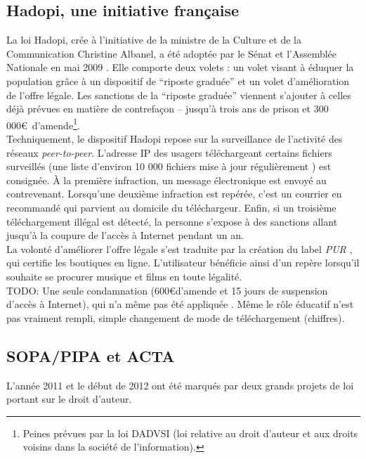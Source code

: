\documentclass[a4paper]{report}
\begin{document}
		\subsection{Hadopi, une initiative française}
		La loi Hadopi, crée à l'initiative de la ministre de la Culture et de la Communication Christine Albanel, a été adoptée par le Sénat et l'Assemblée Nationale en mai 2009 \cite{hadopi-adoption}. Elle comporte deux volets : un volet visant à éduquer la population grâce à un dispositif de ``riposte graduée'' et un volet d'amélioration de l'offre légale. Les sanctions de la ``riposte graduée'' viennent s'ajouter à celles déjà prévues en matière de contrefaçon – jusqu'à trois ans de prison et 300 000\euro\ d'amende\footnote{Peines prévues par la loi DADVSI (loi relative au droit d’auteur et aux droits voisins dans la société de l’information).}.\\

		Techniquement, le dispositif Hadopi repose sur la surveillance de l'activité des réseaux \emph{peer-to-peer}. L'adresse IP des usagers téléchargeant certains fichiers surveillés (une liste d'environ 10 000 fichiers mise à jour régulièrement \cite{hadopi-fichiers-surveilles}) est consignée. À la première infraction, un message électronique est envoyé au contrevenant. Lorsqu'une deuxième infraction est repérée, c'est un courrier en recommandé qui parvient au domicile du téléchargeur. Enfin, si un troisième téléchargement illégal est détecté, la personne s'expose à des sanctions allant jusqu'à la coupure de l'accès à Internet pendant un an.\\

		La volonté d'améliorer l'offre légale s'est traduite par la création du label \emph{PUR} \cite{label-pur}, qui certifie les boutiques en ligne. L'utilisateur bénéficie ainsi d'un repère lorsqu'il souhaite se procurer musique et films en toute légalité.\\

		\label{hadopi-echec}
		TODO: Une seule condamnation (600\euro d'amende et 15 jours de suspension d'accès à Internet), qui n'a même pas été appliquée \cite{hadopi-condamnation}. Même le rôle éducatif n'est pas vraiment rempli, simple changement de mode de téléchargement (chiffres).

		\subsection{SOPA/PIPA et ACTA}
		L'année 2011 et le début de 2012 ont été marqués par deux grands projets de loi portant sur le droit d'auteur.\\
\end{document}
